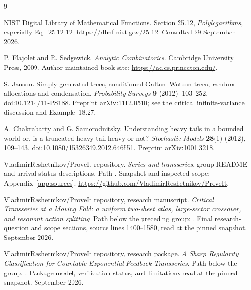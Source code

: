 \documentclass[11pt,a4paper]{article}
\numberwithin{equation}{section}
\theoremstyle{definition}
\theoremstyle{remark}
\begin{document}
\begingroup
\small
\raggedright
\begin{thebibliography}{9}

NIST Digital Library of Mathematical Functions.
Section 25.12, \emph{Polylogarithms}, especially Eq.~25.12.12.
\url{https://dlmf.nist.gov/25.12}.
Consulted 29 September 2026.

P. Flajolet and R. Sedgewick.
\emph{Analytic Combinatorics}.
Cambridge University Press, 2009.
Author-maintained book site: \url{https://ac.cs.princeton.edu/}.

S. Janson.
Simply generated trees, conditioned Galton--Watson trees, random
allocations and condensation.
\emph{Probability Surveys} \textbf{9} (2012), 103--252.
\href{https://doi.org/10.1214/11-PS188}{doi:10.1214/11-PS188}.
Preprint \href{https://arxiv.org/abs/1112.0510}{arXiv:1112.0510};
see the critical infinite-variance discussion and Example~18.27.

A. Chakrabarty and G. Samorodnitsky.
Understanding heavy tails in a bounded world or, is a truncated heavy
tail heavy or not?
\emph{Stochastic Models} \textbf{28}(1) (2012), 109--143.
\href{https://doi.org/10.1080/15326349.2012.646551}{doi:10.1080/15326349.2012.646551}.
Preprint \href{https://arxiv.org/abs/1001.3218}{arXiv:1001.3218}.

VladimirReshetnikov/ProveIt repository.
\emph{Series and transseries}, group README and arrival-status descriptions.
Path .
Snapshot and inspected scope: Appendix~\ref{app:sources}.
\url{https://github.com/VladimirReshetnikov/ProveIt}.

VladimirReshetnikov/ProveIt repository, research manuscript.
\emph{Critical Transseries at a Moving Fold: a uniform two-sheet atlas,
large-sector crossover, and resonant action splitting}.
Path below the preceding group:
.
Final research-question and scope sections, source lines 1400--1580,
read at the pinned snapshot. September 2026.

VladimirReshetnikov/ProveIt repository, research package.
\emph{A Sharp Regularity Classification for Countable Exponential-Feedback
Transseries}.
Path below the group:
.
Package model, verification status, and limitations read at the pinned
snapshot. September 2026.


\end{thebibliography}
\end{document}
